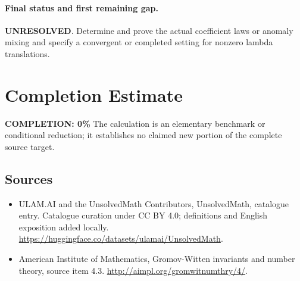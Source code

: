 \documentclass[11pt]{article}
\begin{document}
\paragraph{Final status and first remaining gap.}
\textbf{UNRESOLVED}. Determine and prove the actual coefficient laws or anomaly mixing and specify a convergent or completed setting for nonzero lambda translations.

\section{Completion Estimate}
\noindent\textbf{COMPLETION: 0\%}
The calculation is an elementary benchmark or conditional reduction; it establishes no claimed new portion of the complete source target.

\subsection{Sources}
\begin{itemize}
\item[\hypertarget{source:statement:1}{S1}] ULAM.AI and the UnsolvedMath Contributors, UnsolvedMath, catalogue entry. Catalogue curation under CC BY 4.0; definitions and English exposition added locally.
\url{https://huggingface.co/datasets/ulamai/UnsolvedMath}.
\item[\hypertarget{source:statement:2}{S2}] American Institute of Mathematics, Gromov-Witten invariants and number theory, source item 4.3.
\url{http://aimpl.org/gromwitnumthry/4/}.
\end{itemize}
\label{end:statement}
\end{document}

